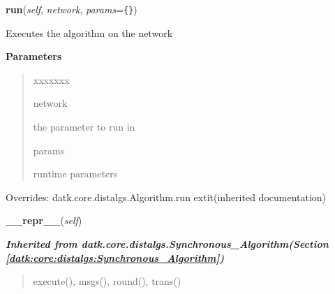 \hspace{.8\funcindent}\begin{boxedminipage}{\funcwidth}

    \raggedright \textbf{run}(\textit{self}, \textit{network}, \textit{params}={\tt \texttt{\{}\texttt{\}}})

\setlength{\parskip}{2ex}
    Executes the algorithm on the network

\setlength{\parskip}{1ex}
      \textbf{Parameters}
      \vspace{-1ex}

      \begin{quote}
        \begin{Ventry}{xxxxxxx}

          \item[network]

          the parameter to run in

          \item[params]

          runtime parameters

        \end{Ventry}

      \end{quote}

      Overrides: datk.core.distalgs.Algorithm.run 	extit{(inherited documentation)}

    \end{boxedminipage}

    \label{datk:core:distalgs:Compose:__repr__}

    \vspace{0.5ex}

\hspace{.8\funcindent}\begin{boxedminipage}{\funcwidth}

    \raggedright \textbf{\_\_repr\_\_}(\textit{self})

\setlength{\parskip}{2ex}
\setlength{\parskip}{1ex}
    \end{boxedminipage}


\large{\textbf{\textit{Inherited from datk.core.distalgs.Synchronous\_Algorithm\textit{(Section \ref{datk:core:distalgs:Synchronous_Algorithm})}}}}

\begin{quote}
execute(), msgs(), round(), trans()
\end{quote}

